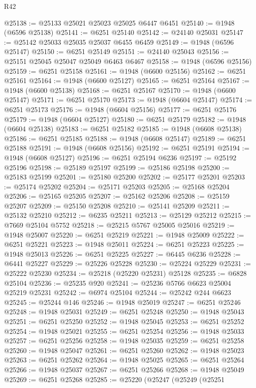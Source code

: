 \begin{lexlean}{R42}
\begin{coremodule}
{@25138 := @25133 @25021 @25023 @25025 @6447 @6451
@25140 := @1948 (@6596 @25138)
@25141 := @6251 @25140
@25142 := @24140 @25031
@25147 := @25142 @25033 @25035 @25037 @6455 @6459
@25149 := @1948 (@6596 @25147)
@25150 := @6251 @25149
@25151 := @24140 @25043
@25156 := @25151 @25045 @25047 @25049 @6463 @6467
@25158 := @1948 (@6596 @25156)
@25159 := @6251 @25158
@25161 := @1948 (@6600 @25156)
@25162 := @6251 @25161
@25164 := @1948 (@6600 @25127)
@25165 := @6251 @25164
@25167 := @1948 (@6600 @25138)
@25168 := @6251 @25167
@25170 := @1948 (@6600 @25147)
@25171 := @6251 @25170
@25173 := @1948 (@6604 @25147)
@25174 := @6251 @25173
@25176 := @1948 (@6604 @25156)
@25177 := @6251 @25176
@25179 := @1948 (@6604 @25127)
@25180 := @6251 @25179
@25182 := @1948 (@6604 @25138)
@25183 := @6251 @25182
@25185 := @1948 (@6608 @25138)
@25186 := @6251 @25185
@25188 := @1948 (@6608 @25147)
@25189 := @6251 @25188
@25191 := @1948 (@6608 @25156)
@25192 := @6251 @25191
@25194 := @1948 (@6608 @25127)
@25196 := @6251 @25194 @6236
@25197 := @25192 @25196
@25198 := @25189 @25197
@25199 := @25186 @25198
@25200 := @25183 @25199
@25201 := @25180 @25200
@25202 := @25177 @25201
@25203 := @25174 @25202
@25204 := @25171 @25203
@25205 := @25168 @25204
@25206 := @25165 @25205
@25207 := @25162 @25206
@25208 := @25159 @25207
@25209 := @25150 @25208
@25210 := @25141 @25209
@25211 := @25132 @25210
@25212 := @6235 @25211
@25213 := @25129 @25212
@25215 := @7669 @25104 @5752
@25218 := @25215 @5767 @25005 @25016
@25219 := @1948 @25007
@25220 := @6251 @25219
@25221 := @1948 @25009
@25222 := @6251 @25221
@25223 := @1948 @25011
@25224 := @6251 @25223
@25225 := @1948 @25013
@25226 := @6251 @25225
@25227 := @6445 @6236
@25228 := @6441 @25227
@25229 := @25226 @25228
@25230 := @25224 @25229
@25231 := @25222 @25230
@25234 := @25218 (@25220 @25231) @25128
@25235 := @6828 @25104
@25236 := @25235 @920
@25241 := @25236 @5766 @6623 @25004 @25219 @25231
@25242 := @6974 @25104
@25244 := @25242 @244 @6623
@25245 := @25244 @146
@25246 := @1948 @25019
@25247 := @6251 @25246
@25248 := @1948 @25031
@25249 := @6251 @25248
@25250 := @1948 @25043
@25251 := @6251 @25250
@25252 := @1948 @25045
@25253 := @6251 @25252
@25254 := @1948 @25021
@25255 := @6251 @25254
@25256 := @1948 @25033
@25257 := @6251 @25256
@25258 := @1948 @25035
@25259 := @6251 @25258
@25260 := @1948 @25047
@25261 := @6251 @25260
@25262 := @1948 @25023
@25263 := @6251 @25262
@25264 := @1948 @25025
@25265 := @6251 @25264
@25266 := @1948 @25037
@25267 := @6251 @25266
@25268 := @1948 @25049
@25269 := @6251 @25268
@25285 := @25220
    (@25247
      (@25249
        (@25251
}
\end{coremodule}
\end{lexlean}
